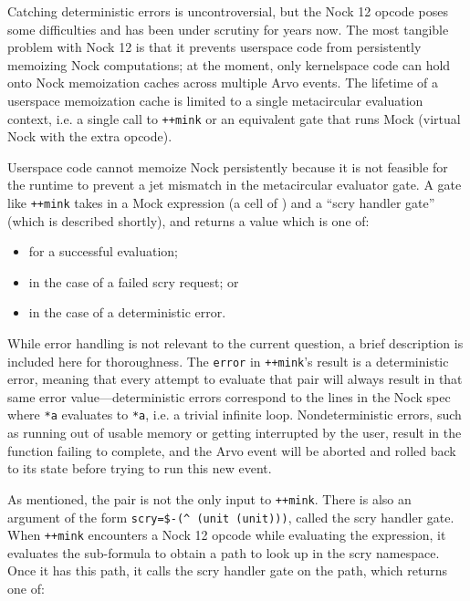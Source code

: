 \documentclass[twoside]{article}
\begin{document}
Catching deterministic errors is uncontroversial, but the Nock 12 opcode poses some difficulties and has been under scrutiny for years now.  The most tangible problem with Nock 12 is that it prevents userspace code from persistently memoizing Nock computations; at the moment, only kernelspace code can hold onto Nock memoization caches across multiple Arvo events.  The lifetime of a userspace memoization cache is limited to a single metacircular evaluation context, i.e. a single call to \texttt{++mink} or an equivalent gate that runs Mock (virtual Nock with the extra opcode).

Userspace code cannot memoize Nock persistently because it is not feasible for the runtime to prevent a jet mismatch in the metacircular evaluator gate.  A gate like \texttt{++mink} takes in a Mock expression (a cell of \texttt{}) and a “scry handler gate” (which is described shortly), and returns a value which is one of:

\begin{itemize}
  \item  \texttt{} for a successful evaluation;
  \item  \texttt{} in the case of a failed scry request; or
  \item  \texttt{} in the case of a deterministic error.
\end{itemize}

\noindent
While error handling is not relevant to the current question, a brief description is included here for thoroughness.  The \texttt{error} in \texttt{++mink}'s result \texttt{} is a deterministic error, meaning that every attempt to evaluate that \texttt{} pair will always result in that same error value—deterministic errors correspond to the lines in the Nock spec where \texttt{*a} evaluates to \texttt{*a}, i.e. a trivial infinite loop.  Nondeterministic errors, such as running out of usable memory or getting interrupted by the user, result in the function failing to complete, and the Arvo event will be aborted and rolled back to its state before trying to run this new event.

As mentioned, the \texttt{} pair is not the only input to \texttt{++mink}.  There is also an argument of the form \texttt{scry=\$-(\string^ (unit (unit)))}, called the scry handler gate.  When \texttt{++mink} encounters a Nock 12 opcode while evaluating the \texttt{} expression, it evaluates the sub-formula to obtain a path to look up in the scry namespace.  Once it has this path, it calls the scry handler gate on the path, which returns one of:
\end{document}
